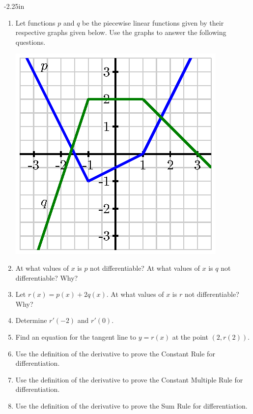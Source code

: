 \begin{adjustwidth*}{}{-2.25in}
\begin{multicols*}{2}
\begin{enumerate}[1),resume]
\item Let functions $p$ and $q$ be the piecewise linear functions given by their respective graphs given below.  Use the graphs to answer the following questions.
\begin{center}
\includegraphics[scale=.7]{figures/2_1_Ez3.eps}
\end{center}
\ba
	\item At what values of $x$ is $p$ not differentiable?  At what values of $x$ is $q$ not differentiable? Why?
	\item Let $r(x) = p(x) + 2q(x)$.  At what values of $x$ is $r$ not differentiable? Why?
	\item Determine $r'(-2)$ and $r'(0)$.
	\item Find an equation for the tangent line to $y = r(x)$ at the point $(2,r(2))$.
\ea

\item Use the definition of the derivative to prove the Constant Rule for differentiation. \label{E:2.4-45}

\item Use the definition of the derivative to prove the Constant Multiple Rule for differentiation. \label{E:2.4-46}

\item Use the definition of the derivative to prove the Sum Rule for differentiation. \label{E:2.4-47}
\end{enumerate}

\end{multicols*}
\end{adjustwidth*}

\afterexercises